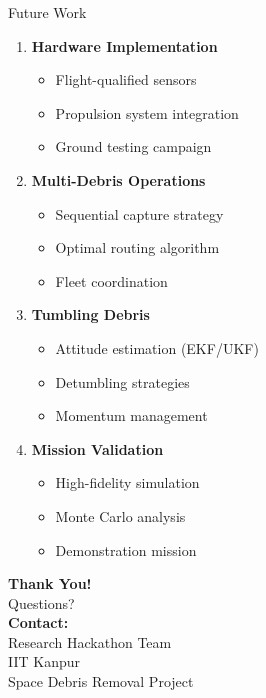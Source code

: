 \documentclass[aspectratio=169]{beamer}
\begin{document}
\begin{frame}{Future Work}
\begin{enumerate}
    \item \textbf{Hardware Implementation}
    \begin{itemize}
        \item Flight-qualified sensors
        \item Propulsion system integration
        \item Ground testing campaign
    \end{itemize}

    \item \textbf{Multi-Debris Operations}
    \begin{itemize}
        \item Sequential capture strategy
        \item Optimal routing algorithm
        \item Fleet coordination
    \end{itemize}

    \item \textbf{Tumbling Debris}
    \begin{itemize}
        \item Attitude estimation (EKF/UKF)
        \item Detumbling strategies
        \item Momentum management
    \end{itemize}

    \item \textbf{Mission Validation}
    \begin{itemize}
        \item High-fidelity simulation
        \item Monte Carlo analysis
        \item Demonstration mission
    \end{itemize}
\end{enumerate}
\end{frame}

\begin{frame}[plain]
\begin{center}
\Huge\textbf{Thank You!}\\[1em]

\Large Questions?\\[2em]

\normalsize
\textbf{Contact:}\\
Research Hackathon Team\\
IIT Kanpur\\
Space Debris Removal Project
\end{center}
\end{frame}
\end{document}
